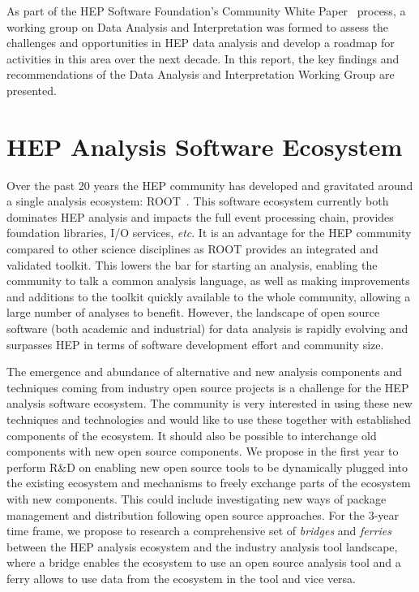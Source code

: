 \documentclass[12pt,a4paper]{article}
\begin{document}
As part of the HEP Software Foundation’s Community White Paper~\cite{HSF-CWP-2017-01} process, a working group on Data Analysis and Interpretation was formed to assess the challenges and opportunities in HEP data analysis and develop a roadmap for activities in this area over the next decade. In this report, the key findings and recommendations of the Data Analysis and Interpretation Working Group are presented.

\section{HEP Analysis Software Ecosystem}

Over the past 20 years the HEP community has developed and gravitated around a single analysis ecosystem: ROOT~\cite{Brun1996}. This software ecosystem currently both dominates HEP analysis and impacts the full event processing chain, provides foundation libraries, I/O services, {\it etc}. It is an advantage for the HEP community compared to other science disciplines as ROOT provides an integrated and validated toolkit. This lowers the bar for starting an analysis, enabling the community to talk a common analysis language, as well as making improvements and additions to the toolkit quickly available to the whole community, allowing a large number of analyses to benefit. However, the landscape of open source software (both academic and industrial) for data analysis is rapidly evolving and surpasses HEP in terms of software development effort and community size. 

The emergence and abundance of alternative and new analysis components and techniques coming from industry open source projects is a challenge for the HEP analysis software ecosystem. The community is very interested in using these new techniques and technologies and would like to use these together with established components of the ecosystem. It should  also be possible to interchange old components with new open source components. We propose in the first year to perform R\&D on enabling new open source tools to be dynamically plugged into the existing ecosystem and mechanisms to freely exchange parts of the ecosystem with new components. This could include investigating new ways of package management and distribution following open source approaches. For the 3-year time frame, we propose to research a comprehensive set of {\it bridges} and {\it ferries} between the HEP analysis ecosystem and the industry analysis tool landscape, where a bridge enables the ecosystem to use an open source analysis tool and a ferry allows to use data from the ecosystem in the tool and vice versa.
\end{document}
